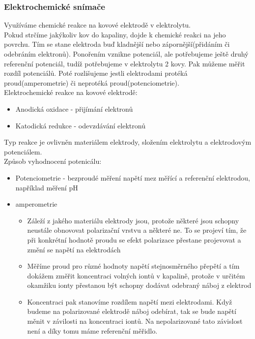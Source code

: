\subsubsection{Elektrochemické snímače}
Využíváme chemické reakce na kovové elektrodě v elektrolytu.\\
Pokud strčíme jakýkoliv kov do kapaliny, dojde k chemické reakci na jeho povrchu. Tím se stane elektroda buď kladnější nebo zápornější(přidáním či odebráním elektronů). Ponořením vznikne potenciál, ale potřebujeme ještě druhý referenční potenciál, tudíž potřebujeme v elektrolytu 2 kovy. Pak můžeme měřit rozdíl potenciálů. Poté rozlišujeme jestli elektrodami protéká proud(amperometrie) či neprotéká proud(potenciometrie).\\
Elektrochemické reakce na kovové elektrodě:
\begin{itemize}
    \item Anodická oxidace - přijímání elektronů
    \item Katodická redukce - odevzdávání elektronů
\end{itemize}
Typ reakce je ovlivněn materiálem elektrody, složením elektrolytu a elektrodovým potenciálem.\\
Způsob vyhodnocení potenicálu:
\begin{itemize}
    \item Potenciometrie - bezproudé měření napětí mez měřící a referenční elektrodou, například měření pH
    \item amperometrie
          \begin{itemize}
              \item Záleží z jakého materiálu elektrody jsou, protože některé jsou schopny neustále obnovovat polarizační vrstvu a některé ne. To se projeví tím, že při konkrétní hodnotě proudu se efekt polarizace přestane projevovat a změní se napětí na elektrodách
              \item Měříme proud pro různé hodnoty napětí stejnosměrného přepětí a tím dokážem změřit koncentraci volných iontů v kapalině, protože v určitém okamžiku ionty přestanou být schopny dodávat odebraný náboj z elektrod
              \item Koncentraci pak stanovíme rozdílem napětí mezi elektrodami. Když budeme na polarizované elektrodě náboj odebírat, tak se bude napětí měnit v závilosti na koncentraci iontů. Na nepolarizované tato závislost není a díky tomu máme referenční měřidlo.
          \end{itemize}
\end{itemize}
